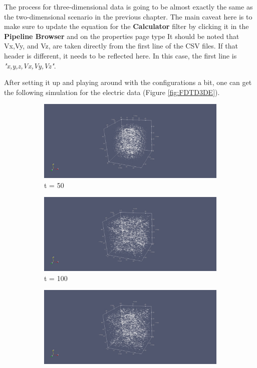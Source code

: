 The process for three-dimensional data is going to be almost exactly the same as the two-dimensional scenario in the previous chapter. The main caveat here is to make sure to update the equation for the \textbf{Calculator} filter by clicking it in the \textbf{Pipeline Browser} and on the properties page type  It should be noted that Vx,Vy, and Vz, are taken directly from the first line of the CSV files. If that header is different, it needs to be reflected here. In this case, the first line is \textit{"x,y,z,Vx,Vy,Vz"}.

After setting it up and playing around with the configurations a bit, one can get the following simulation for the electric data (Figure \ref{fig:FDTD3DE}).

\begin{figure}[h!]
	\centering
	\begin{subfigure}{.49\textwidth}
		\centering
		\includegraphics[width=.95\linewidth]{Figures/FDTD3DE1}
		\caption{t = 50}
	\end{subfigure}
	\begin{subfigure}{.49\textwidth}
		\centering
		\includegraphics[width=.95\linewidth]{Figures/FDTD3DE2}
		\caption{t = 100}
	\end{subfigure}
	\begin{subfigure}{.49\textwidth}
		\centering
		\includegraphics[width=.95\linewidth]{Figures/FDTD3DE3}

\end{subfigure}
\end{figure}
